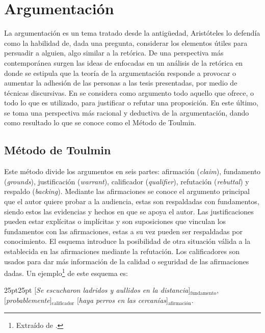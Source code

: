 \documentclass[a4paper,11pt,twocolumn,twoside]{article}
\begin{document}

\section{Argumentación}

La argumentación es un tema tratado desde la antigüedad, Aristóteles lo defendía como la 
habilidad de, dada una pregunta, considerar los elementos útiles para persuadir a alguien, algo
similar a la retórica. De una perspectiva más contemporánea surgen las ideas de 
\cite{perelman1969rhetoric}
enfocadas en un análisis de la retórica en donde se estipula que la teoría de la argumentación
responde a provocar o aumentar la adhesión de las personas a las tesis presentadas, por medio de 
técnicas discursivas. En 
\cite{toulmin_2003}
se considera como argumento todo aquello que ofrece, 
o todo lo que es utilizado, para justificar o refutar una proposición. En este último, se toma 
una perspectiva más racional y deductiva de la argumentación, dando como resultado lo que se 
conoce como el Método de Toulmin. 

\subsection{Método de Toulmin}

Este método divide los argumentos en seis partes: afirmación 
(\textit{claim}), fundamento (\textit{grounds}), justificación (\textit{warrant}), calificador 
(\textit{qualifier}), refutación (\textit{rebuttal}) y respaldo (\textit{backing}).
Mediante las afirmaciones se conoce el argumento principal que el autor quiere probar a la audiencia,
estas son respaldadas con fundamentos, siendo estos las evidencias y hechos en que se apoya el autor.
Las justificaciones pueden estar explícitas o implícitas y son suposiciones que vinculan los
fundamentos con las afirmaciones, estas a su vez pueden ser respaldadas por conocimiento.
El esquema introduce la posibilidad de otra situación válida a la establecida en las afirmaciones
mediante la refutación. Los calificadores son usados para dar más información de la calidad o seguridad
de las afirmaciones dadas. Un ejemplo\footnote{Extraído de
	\cite{toulminArgument}.
} de este esquema es:

\begin{adjustwidth}{25pt}{25pt}
	[\textit{Se escucharon ladridos y aullidos en la distancia}]$_{\mathrm{fundamento}}$, 
	[\textit{probablemente}]$_{\mathrm{calificador}}$
	[\textit{haya perros en las cercanías}]$_{\mathrm{\text{afirmación}}}$.
\end{adjustwidth}
\end{document}

